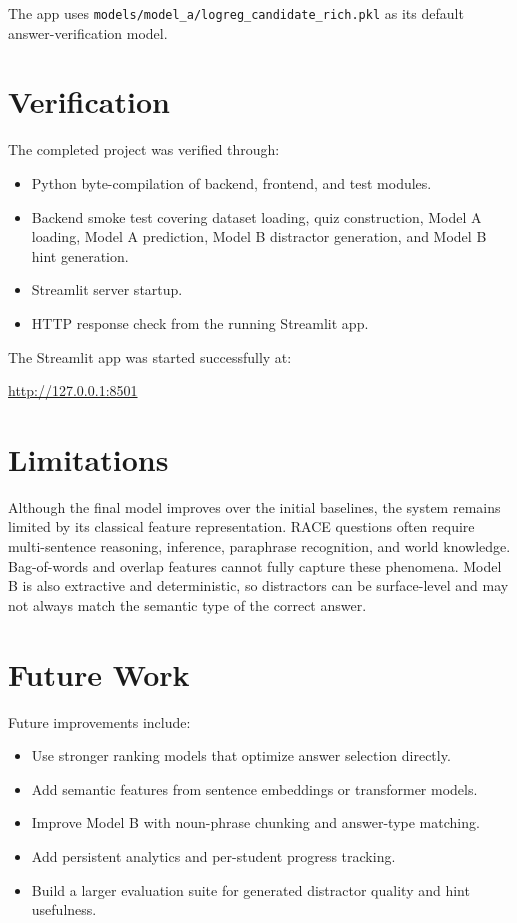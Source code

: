 \documentclass[12pt,a4paper]{article}
\begin{document}
The app uses \texttt{models/model\_a/logreg\_candidate\_rich.pkl} as its default
answer-verification model.

\section{Verification}

The completed project was verified through:

\begin{itemize}
    \item Python byte-compilation of backend, frontend, and test modules.
    \item Backend smoke test covering dataset loading, quiz construction, Model
    A loading, Model A prediction, Model B distractor generation, and Model B
    hint generation.
    \item Streamlit server startup.
    \item HTTP response check from the running Streamlit app.
\end{itemize}

The Streamlit app was started successfully at:

\begin{center}
\url{http://127.0.0.1:8501}
\end{center}

\section{Limitations}

Although the final model improves over the initial baselines, the system remains
limited by its classical feature representation. RACE questions often require
multi-sentence reasoning, inference, paraphrase recognition, and world
knowledge. Bag-of-words and overlap features cannot fully capture these
phenomena. Model B is also extractive and deterministic, so distractors can be
surface-level and may not always match the semantic type of the correct answer.

\section{Future Work}

Future improvements include:

\begin{itemize}
    \item Use stronger ranking models that optimize answer selection directly.
    \item Add semantic features from sentence embeddings or transformer models.
    \item Improve Model B with noun-phrase chunking and answer-type matching.
    \item Add persistent analytics and per-student progress tracking.
    \item Build a larger evaluation suite for generated distractor quality and
    hint usefulness.
\end{itemize}
\end{document}
